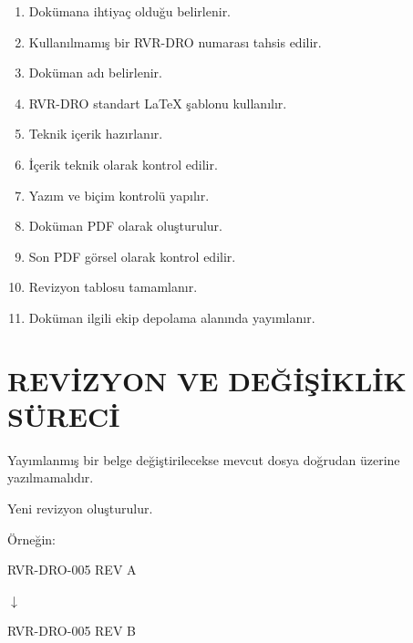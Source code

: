 \documentclass[11pt,a4paper]{article}
\begin{document}
\begin{enumerate}

    \item Dokümana ihtiyaç olduğu belirlenir.

    \item Kullanılmamış bir RVR-DRO numarası tahsis edilir.

    \item Doküman adı belirlenir.

    \item RVR-DRO standart LaTeX şablonu kullanılır.

    \item Teknik içerik hazırlanır.

    \item İçerik teknik olarak kontrol edilir.

    \item Yazım ve biçim kontrolü yapılır.

    \item Doküman PDF olarak oluşturulur.

    \item Son PDF görsel olarak kontrol edilir.

    \item Revizyon tablosu tamamlanır.

    \item Doküman ilgili ekip depolama alanında yayımlanır.

\end{enumerate}


\newpage

\section{REVİZYON VE DEĞİŞİKLİK SÜRECİ}

Yayımlanmış bir belge değiştirilecekse mevcut dosya doğrudan üzerine
yazılmamalıdır.

Yeni revizyon oluşturulur.

Örneğin:

\begin{center}

RVR-DRO-005 REV A

$\downarrow$

RVR-DRO-005 REV B

\end{center}
\end{document}
